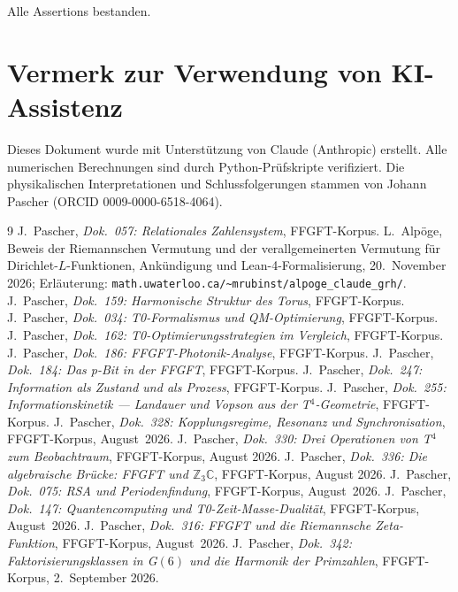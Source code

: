 Alle Assertions bestanden.

\section*{Vermerk zur Verwendung von KI-Assistenz}

Dieses Dokument wurde mit Unterstützung von Claude (Anthropic) erstellt.
Alle numerischen Berechnungen sind durch Python-Prüfskripte verifiziert.
Die physikalischen Interpretationen und Schlussfolgerungen stammen von
Johann Pascher (ORCID 0009-0000-6518-4064).

\begin{thebibliography}{9}
 J.~Pascher, \textit{Dok.~057: Relationales Zahlensystem}, FFGFT-Korpus.
 L.~Alpöge, Beweis der Riemannschen Vermutung und der verallgemeinerten Vermutung für Dirichlet-$L$-Funktionen, Ankündigung und Lean-4-Formalisierung, 20.~November 2026; Erläuterung: \texttt{math.uwaterloo.ca/\allowbreak\textasciitilde mrubinst/\allowbreak alpoge\_claude\_grh/}.
 J.~Pascher, \textit{Dok.~159: Harmonische Struktur des Torus}, FFGFT-Korpus.
 J.~Pascher, \textit{Dok.~034: T0-Formalismus und QM-Optimierung}, FFGFT-Korpus.
 J.~Pascher, \textit{Dok.~162: T0-Optimierungsstrategien im Vergleich}, FFGFT-Korpus.
 J.~Pascher, \textit{Dok.~186: FFGFT-Photonik-Analyse}, FFGFT-Korpus.
 J.~Pascher, \textit{Dok.~184: Das p-Bit in der FFGFT}, FFGFT-Korpus.
 J.~Pascher, \textit{Dok.~247: Information als Zustand und als Prozess}, FFGFT-Korpus.
 J.~Pascher, \textit{Dok.~255: Informationskinetik --- Landauer und Vopson aus der T$^4$-Geometrie}, FFGFT-Korpus.
 J.~Pascher, \textit{Dok.~328: Kopplungsregime, Resonanz und Synchronisation}, FFGFT-Korpus, August~2026.
 J.~Pascher, \textit{Dok.~330: Drei Operationen von T$^4$ zum Beobachtraum}, FFGFT-Korpus, August 2026.
 J.~Pascher, \textit{Dok.~336: Die algebraische Brücke: FFGFT und $\mathbb{Z}_3\mathbb{C}$}, FFGFT-Korpus, August 2026.
 J.~Pascher, \textit{Dok.~075: RSA und Periodenfindung}, FFGFT-Korpus, August~2026.
 J.~Pascher, \textit{Dok.~147: Quantencomputing und T0-Zeit-Masse-Dualität}, FFGFT-Korpus, August~2026.
 J.~Pascher, \textit{Dok.~316: FFGFT und die Riemannsche Zeta-Funktion}, FFGFT-Korpus, August~2026.
 J.~Pascher, \textit{Dok.~342: Faktorisierungsklassen in G$(6)$ und die Harmonik der Primzahlen}, FFGFT-Korpus, 2.~September 2026.

\end{thebibliography}
